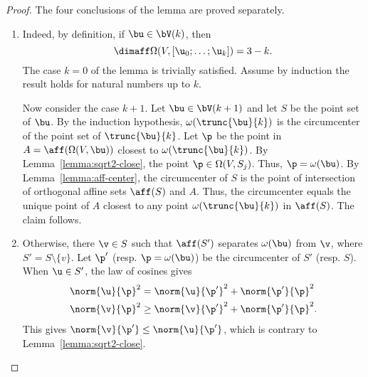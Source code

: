 \begin{proof} The four conclusions of the lemma  are proved
separately.

\begin{enumerate}
\item {} Indeed, by
definition, if $\bu\in \bV(k)$, then
\[  
\dimaff\Omega(V,[\u_0;\ldots;\u_k]) = 3-k.
\]   
The case $k=0$ of the lemma is trivially satisfied.  Assume by
induction the result holds for natural numbers up to $k$.

Now consider the case $k+1$.  Let $\bu\in \bV(k+1)$ and let $S$ be
the point set of $\bu$.  By the induction hypothesis,
$\omega(\trunc{\bu}{k})$ is the circumcenter of the point set of
$\trunc{\bu}{k}$.  Let $\p$ be the point in
$A=\aff(\Omega(V,\bu))$ closest to $\omega(\trunc{\bu}{k})$.  By
Lemma~\ref{lemma:sqrt2-close}, the point $\p\in\Omega(V,S_{j})$.
Thus, $\p=\omega(\bu)$.  By Lemma~\ref{lemma:aff-center}, the
circumcenter of $S$ is the point of intersection of orthogonal affine
sets $\aff(S)$ and $A$.  Thus, the circumcenter equals the unique
point of $A$ closest to any point $\omega(\trunc{\bu}{k})$ in
$\aff(S)$.  The claim follows.



\item{} 
Otherwise, there $\v\in S$ such that $\aff(S')$ separates $\omega(\bu)$ from
$ \v$, where $S'=S\setminus\{v\}$.  Let $\p'$ (resp. $\p=\omega(\bu)$)
be the circumcenter
of $S'$ (resp. $S$).  When $\u\in S'$, the law of cosines gives
\begin{align*} 
\norm{ \u}{\p}^2 &= \norm{\u}{\p'}^2 + \norm{\p'}{\p}^2\\ 
\norm{ \v}{\p}^2 &\ge \norm{\v}{\p'}^2 + \norm{\p'}{\p}^2.
\end{align*}
This gives $\norm{\v}{\p'}\le \norm{\u}{\p'}$, which is contrary to
Lemma~\ref{lemma:sqrt2-close}.


\end{enumerate}
\end{proof}
